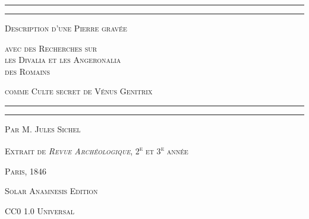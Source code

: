 \documentclass[a4paper, 11pt, oneside, polutonikogreek, french]{article}
\begin{document}
\begin{titlepage} %
	\centering %

	
	\rule{\textwidth}{1.6pt}\vspace*{-\baselineskip}\vspace*{2pt} %
	\rule{\textwidth}{0.4pt} %
	
	{\scshape\small Description d'une Pierre gravée}
	
	{\scshape\normalsize avec des Recherches sur \\\LARGE les Divalia et les Angeronalia \\\LARGE des Romains}
	
	{\scshape\small comme Culte secret de Vénus Genitrix}
	
	\rule{\textwidth}{0.4pt}\vspace*{-\baselineskip}\vspace{3.2pt} %
	\rule{\textwidth}{1.6pt} %

	

	\vspace{1\baselineskip}
	
	{\scshape Par \Large M. Jules Sichel} %
	
    
	
	
    \vspace*{\fill}

	\vspace{1\baselineskip}

	{\small\scshape Extrait de \emph{Revue Archéologique}, 2\textsuperscript{e} et 3\textsuperscript{e} année}
	
	{\small\scshape{Paris, 1846}}
	
	\vspace{0.5\baselineskip} %

    \scshape Solar Anamnesis Edition  %
	
	{\scshape\small CC0 1.0 Universal} %
\end{titlepage}
\setlength{\parskip}{1mm plus1mm minus1mm}
\setcounter{tocdepth}{3}
\setcounter{secnumdepth}{3}
\tableofcontents
\clearpage
\listoffigures
\clearpage
\end{document}
